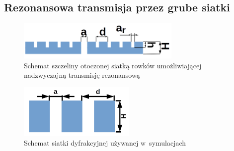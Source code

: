 \subsection{Rezonansowa transmisja przez grube siatki}
\label{subart:rezo-grating}

\begin{figure}[tb]
	\centering
	\includegraphics[width=0.7\textwidth]{images/thz/schemat-1szczelina.png}
	\caption{Schemat szczeliny otoczonej siatką rowków umożliwiającej nadzwyczajną transmisję rezonansową}
	\label{fig:szczelina-schem}
\end{figure}

\begin{figure}
	\includegraphics[width=0.5\textwidth]{images/thz/schemat-siatka.png}
	\caption{Schemat siatki dyfrakcyjnej używanej w~symulacjach}
	\label{fig:rezo-siat-H}
\end{figure}

